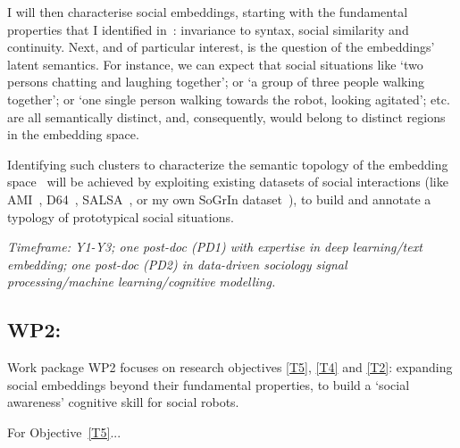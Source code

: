 I will then characterise social embeddings, starting with the fundamental
properties that I identified in~\cite{lemaignan2024social}: invariance to
syntax, social similarity and continuity. Next, and of particular interest, is
the question of the embeddings' latent semantics. For instance, we can expect
that social situations like `two persons chatting and laughing together'; or `a
group of three people walking together'; or `one single person walking towards
the robot, looking agitated'; etc.  are all semantically distinct, and,
consequently, would belong to distinct regions in the embedding space.

Identifying such clusters to characterize the semantic topology of the embedding
space~\cite{sun2023topological} will be achieved by exploiting existing datasets
of social interactions (like AMI~\cite{carletta2007ami},
D64~\cite{oertel2013d64}, SALSA~\cite{alameda2015salsa}, or my own SoGrIn
dataset~\cite{webb2023sogrin}), to build and annotate a typology of prototypical
social situations.

\vspace{1em}
\noindent\emph{ Timeframe: Y1-Y3; one post-doc (PD1) with expertise in
    deep learning/text embedding; one post-doc (PD2) in data-driven sociology
signal processing/machine learning/cognitive modelling.}


\subsection{WP2: \textbf{\wpTwo}} 

Work package WP2 focuses on research objectives \ref{T5}, \ref{T4} and \ref{T2}: expanding
social embeddings beyond their fundamental properties, to build a `social
awareness' cognitive skill for social robots.





For Objective~\ref{T5}...

